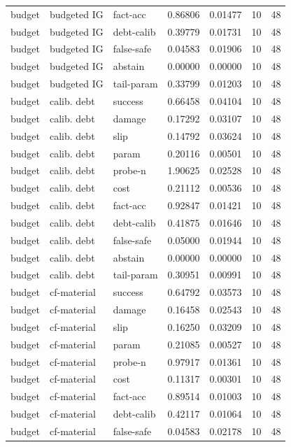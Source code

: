 \documentclass{article}
\begin{document}
\begin{center}
\begin{longtable}{lllllll}
budget & budgeted IG & fact-acc & 0.86806 & 0.01477 & 10 & 48 \\
budget & budgeted IG & debt-calib & 0.39779 & 0.01731 & 10 & 48 \\
budget & budgeted IG & false-safe & 0.04583 & 0.01906 & 10 & 48 \\
budget & budgeted IG & abstain & 0.00000 & 0.00000 & 10 & 48 \\
budget & budgeted IG & tail-param & 0.33799 & 0.01203 & 10 & 48 \\
budget & calib. debt & success & 0.66458 & 0.04104 & 10 & 48 \\
budget & calib. debt & damage & 0.17292 & 0.03107 & 10 & 48 \\
budget & calib. debt & slip & 0.14792 & 0.03624 & 10 & 48 \\
budget & calib. debt & param & 0.20116 & 0.00501 & 10 & 48 \\
budget & calib. debt & probe-n & 1.90625 & 0.02528 & 10 & 48 \\
budget & calib. debt & cost & 0.21112 & 0.00536 & 10 & 48 \\
budget & calib. debt & fact-acc & 0.92847 & 0.01421 & 10 & 48 \\
budget & calib. debt & debt-calib & 0.41875 & 0.01646 & 10 & 48 \\
budget & calib. debt & false-safe & 0.05000 & 0.01944 & 10 & 48 \\
budget & calib. debt & abstain & 0.00000 & 0.00000 & 10 & 48 \\
budget & calib. debt & tail-param & 0.30951 & 0.00991 & 10 & 48 \\
budget & cf-material & success & 0.64792 & 0.03573 & 10 & 48 \\
budget & cf-material & damage & 0.16458 & 0.02543 & 10 & 48 \\
budget & cf-material & slip & 0.16250 & 0.03209 & 10 & 48 \\
budget & cf-material & param & 0.21085 & 0.00527 & 10 & 48 \\
budget & cf-material & probe-n & 0.97917 & 0.01361 & 10 & 48 \\
budget & cf-material & cost & 0.11317 & 0.00301 & 10 & 48 \\
budget & cf-material & fact-acc & 0.89514 & 0.01003 & 10 & 48 \\
budget & cf-material & debt-calib & 0.42117 & 0.01064 & 10 & 48 \\
budget & cf-material & false-safe & 0.04583 & 0.02178 & 10 & 48 \\
\bottomrule
\end{longtable}
\renewcommand{\arraystretch}{1.0}
\end{center}
\end{document}
